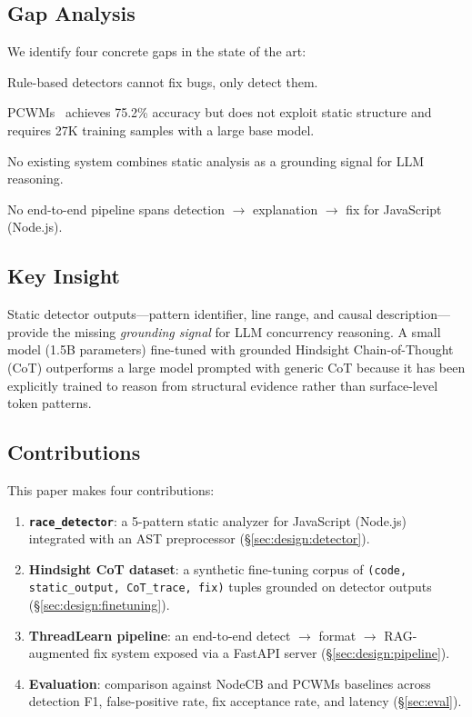 \documentclass[11pt]{article}
\begin{document}
\subsection{Gap Analysis}

We identify four concrete gaps in the state of the art:

\begin{description}[leftmargin=2em, labelwidth=2em]
  \item[\textbf{G1}] Rule-based detectors cannot fix bugs, only detect them.
  \item[\textbf{G2}] PCWMs~\cite{pcwms2026} achieves 75.2\% accuracy but does
    not exploit static structure and requires 27K training samples with a large
    base model.
  \item[\textbf{G3}] No existing system combines static analysis as a grounding
    signal for LLM reasoning.
  \item[\textbf{G4}] No end-to-end pipeline spans detection $\to$ explanation
    $\to$ fix for JavaScript (Node.js).
\end{description}

\subsection{Key Insight}

Static detector outputs---pattern identifier, line range, and causal
description---provide the missing \emph{grounding signal} for LLM concurrency
reasoning.
A small model (1.5B parameters) fine-tuned with grounded Hindsight
Chain-of-Thought (CoT) outperforms a large model prompted with generic CoT
because it has been explicitly trained to reason from structural evidence rather
than surface-level token patterns.

\subsection{Contributions}

This paper makes four contributions:

\begin{enumerate}[leftmargin=2em]
  \item \textbf{\texttt{race\_detector}}: a 5-pattern static analyzer for
    JavaScript (Node.js) integrated with an AST preprocessor (\S\ref{sec:design:detector}).
  \item \textbf{Hindsight CoT dataset}: a synthetic fine-tuning corpus of
    \texttt{(code, static\_output, CoT\_trace, fix)} tuples grounded on
    detector outputs (\S\ref{sec:design:finetuning}).
  \item \textbf{ThreadLearn pipeline}: an end-to-end detect $\to$ format $\to$
    RAG-augmented fix system exposed via a FastAPI server
    (\S\ref{sec:design:pipeline}).
  \item \textbf{Evaluation}: comparison against NodeCB and PCWMs baselines
    across detection F1, false-positive rate, fix acceptance rate, and latency
    (\S\ref{sec:eval}).
\end{enumerate}
\end{document}
